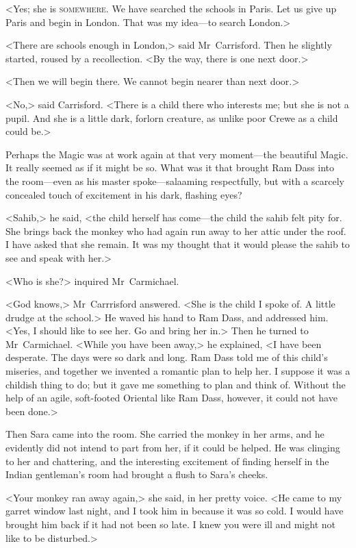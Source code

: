 <Yes; she is \textsc{somewhere}. We have searched the schools in Paris. Let us give up Paris and begin in London. That was my idea—to search London.>

<There are schools enough in London,> said Mr~Carrisford. Then he slightly started, roused by a recollection. <By the way, there is one next door.>

<Then we will begin there. We cannot begin nearer than next door.>

<No,> said Carrisford. <There is a child there who interests me; but she is not a pupil. And she is a little dark, forlorn creature, as unlike poor Crewe as a child could be.>

Perhaps the Magic was at work again at that very moment—the beautiful Magic. It really seemed as if it might be so. What was it that brought Ram Dass into the room—even as his master spoke—salaaming respectfully, but with a scarcely concealed touch of excitement in his dark, flashing eyes?

<Sahib,> he said, <the child herself has come—the child the sahib felt pity for. She brings back the monkey who had again run away to her attic under the roof. I have asked that she remain. It was my thought that it would please the sahib to see and speak with her.>

<Who is she?> inquired Mr~Carmichael.

<God knows,> Mr~Carrrisford answered. <She is the child I spoke of. A little drudge at the school.> He waved his hand to Ram Dass, and addressed him. <Yes, I should like to see her. Go and bring her in.> Then he turned to Mr~Carmichael. <While you have been away,> he explained, <I have been desperate. The days were so dark and long. Ram Dass told me of this child's miseries, and together we invented a romantic plan to help her. I suppose it was a childish thing to do; but it gave me something to plan and think of. Without the help of an agile, soft-footed Oriental like Ram Dass, however, it could not have been done.>

Then Sara came into the room. She carried the monkey in her arms, and he evidently did not intend to part from her, if it could be helped. He was clinging to her and chattering, and the interesting excitement of finding herself in the Indian gentleman's room had brought a flush to Sara's cheeks.

<Your monkey ran away again,> she said, in her pretty voice. <He came to my garret window last night, and I took him in because it was so cold. I would have brought him back if it had not been so late. I knew you were ill and might not like to be disturbed.>

